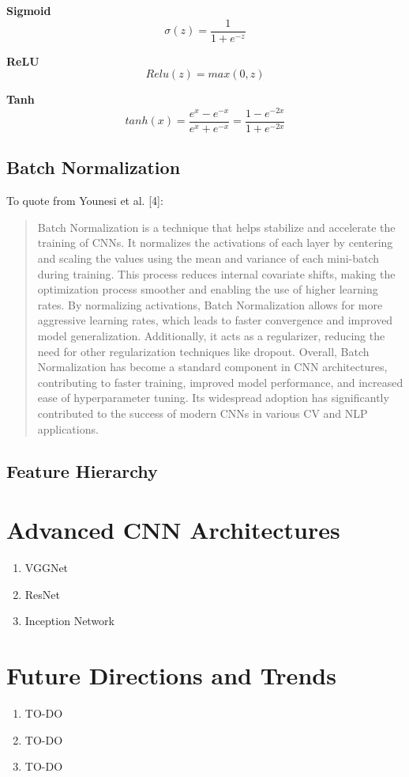 \documentclass{article}
\begin{document}
        \textbf{Sigmoid}
        \[ \sigma(z) = \frac{1} {1 + e^{-z}} \]

        \textbf{ReLU}
        \[ Relu(z) = max(0, z) \]

        \textbf{Tanh}
        \[ tanh(x) = \frac{e^x - e^{-x}}{e^x + e^{-x}} = \frac{1 - e^{-2x}}{1 + e^{-2x}} \]

    \subsection{Batch Normalization}
        To quote from Younesi et al. [4]:

        \begin{quote}
            Batch Normalization is a technique that helps stabilize and accelerate the training of CNNs. It normalizes the activations of each layer by centering and scaling the values using the mean and variance of each mini-batch during training. This process reduces internal covariate shifts, making the optimization process smoother and enabling the use of higher learning rates. By normalizing activations, Batch Normalization allows for more aggressive learning rates, which leads to faster convergence and improved model generalization. Additionally, it acts as a regularizer, reducing the need for other regularization techniques like dropout. Overall, Batch Normalization has become a standard component in CNN architectures, contributing to faster training, improved model performance, and increased ease of hyperparameter tuning. Its widespread adoption has significantly contributed to the success of modern CNNs in various CV and NLP applications.
        \end{quote}
    

    \subsection{Feature Hierarchy}
    
\section{Advanced CNN Architectures}
    \begin{enumerate}[label=(\alph*)]
        \item VGGNet
        \item ResNet
        \item Inception Network
    \end{enumerate}
    
\section{Future Directions and Trends}
    \begin{enumerate}[label=(\alph*)]
        \item TO-DO
        \item TO-DO
        \item TO-DO
    \end{enumerate}
\end{document}
